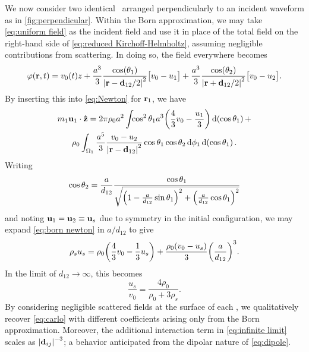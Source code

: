 We now consider two identical \bubbles\ arranged perpendicularly to an incident waveform as in \cref{fig:perpendicular}.
Within the Born approximation, we may take \cref{eq:uniform field} as the incident field and use it in place of the total field on the right-hand side of \cref{eq:reduced Kirchoff-Helmholtz}, assuming negligible contributions from scattering. In doing so, the field everywhere becomes
\begin{equation}
  \varphi(\vb{r}, t) = v_0(t) z + \frac{a^3}{3} \frac{\cos(\theta_1)}{\abs{\vb{r} - \vb{d}_{12}/2}^2}\qty\big[v_0 - u_1]
                                + \frac{a^3}{3} \frac{\cos(\theta_2)}{\abs{\vb{r} + \vb{d}_{12}/2}^2}\qty\big[v_0 - u_2].
  \label{eq:carlo}
\end{equation}
By inserting this into \cref{eq:Newton} for $\vb{r}_1$, we have
\begin{equation}
  \label{eq:born newton}
  \begin{gathered}
    m_1 \vb{u}_1 \cdot \vu{z} = 2 \pi \rho_0 a^2 \int_{} \cos^2\theta_1 a^3 \qty(\frac{4}{3}v_0 - \frac{u_1}{3}) \dd{\qty(\cos\theta_1)} + \\
    \rho_0 \int_{\Omega_1} \frac{a^5}{3} \frac{v_0 - u_2}{\abs{\vb{r} - \vb{d}_{12}}^2} \cos\theta_1 \cos\theta_2 \dd{\phi_1} \dd{\qty(\cos \theta_1)}.
  \end{gathered}
\end{equation}
Writing
\begin{equation}
  \cos\theta_2 = \frac{a}{d_{12}} \frac{\cos\theta_1}{\sqrt{\qty(1 - \frac{a}{d_{12}}\sin\theta_1)^2 + \qty(\frac{a}{d_{12}}\cos\theta_1)^2}}
\end{equation}
and noting $\vb{u}_1 = \vb{u}_2 \equiv \vb{u}_s$ due to symmetry in the initial configuration, we may expand \cref{eq:born newton} in $a/d_{12}$ to give
\begin{equation}
  \label{eq:two bubble born}
  \rho_s u_s = \rho_0\qty(\frac{4}{3}v_0 - \frac{1}{3}u_s) + \frac{\rho_0\qty(v_0 - u_s)}{3}\qty(\frac{a}{d_{12}})^3.
\end{equation}
In the limit of $d_{12} \to \infty$, this becomes
\begin{equation}
  \frac{u_s}{v_0} = \frac{4 \rho_0}{\rho_0 + 3\rho_s}.
  \label{eq:infinite limit}
\end{equation}
By considering negligible scattered fields at the surface of each \bubble, we qualitatively recover \cref{eq:carlo} with different coefficients arising only from the Born approximation.
Moreover, the additional interaction term in \cref{eq:infinite limit} scales as $\abs{\vb{d}_{ij}}^{-3}$; a behavior anticipated from the dipolar nature of \cref{eq:dipole}.
